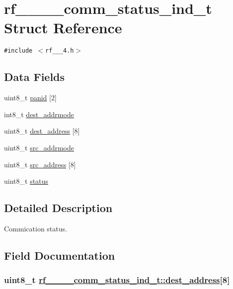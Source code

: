 \hypertarget{structrf__802__15__4__comm__status__ind__t}{
\section{rf\_\_\_\_\-comm\_\-status\_\-ind\_\-t Struct Reference}
\label{structrf__802__15__4__comm__status__ind__t}
}
{\tt \#include $<$rf\_\_\_\-4.h$>$}

\subsection*{Data Fields}
\begin{CompactItemize}
\item 
uint8\_\-t \hyperlink{structrf__802__15__4__comm__status__ind__t_05f311f7f9aa903839bd9785d539b96c}{panid} \mbox{[}2\mbox{]}
\item 
int8\_\-t \hyperlink{structrf__802__15__4__comm__status__ind__t_71c54d414c1afbeb6074a8d0487cafde}{dest\_\-addrmode}
\item 
uint8\_\-t \hyperlink{structrf__802__15__4__comm__status__ind__t_0c1a4fe2334dbc01043e3837b7c60732}{dest\_\-address} \mbox{[}8\mbox{]}
\item 
uint8\_\-t \hyperlink{structrf__802__15__4__comm__status__ind__t_1deccf74af49075ccf27788bf7a41084}{src\_\-addrmode}
\item 
uint8\_\-t \hyperlink{structrf__802__15__4__comm__status__ind__t_3d8825053b35dbb8ee9ea4fbd2226423}{src\_\-address} \mbox{[}8\mbox{]}
\item 
uint8\_\-t \hyperlink{structrf__802__15__4__comm__status__ind__t_674eed88c71b40a8df8b93af54cb8ad0}{status}
\end{CompactItemize}


\subsection{Detailed Description}
Commication status. 



\subsection{Field Documentation}
\hypertarget{structrf__802__15__4__comm__status__ind__t_0c1a4fe2334dbc01043e3837b7c60732}{
\subsubsection[dest\_\-address]{\setlength{\rightskip}{0pt plus 5cm}uint8\_\-t \hyperlink{structrf__802__15__4__comm__status__ind__t_0c1a4fe2334dbc01043e3837b7c60732}{rf\_\_\_\_\-comm\_\-status\_\-ind\_\-t::dest\_\-address}\mbox{[}8\mbox{]}}}
\label{structrf__802__15__4__comm__status__ind__t_0c1a4fe2334dbc01043e3837b7c60732}


